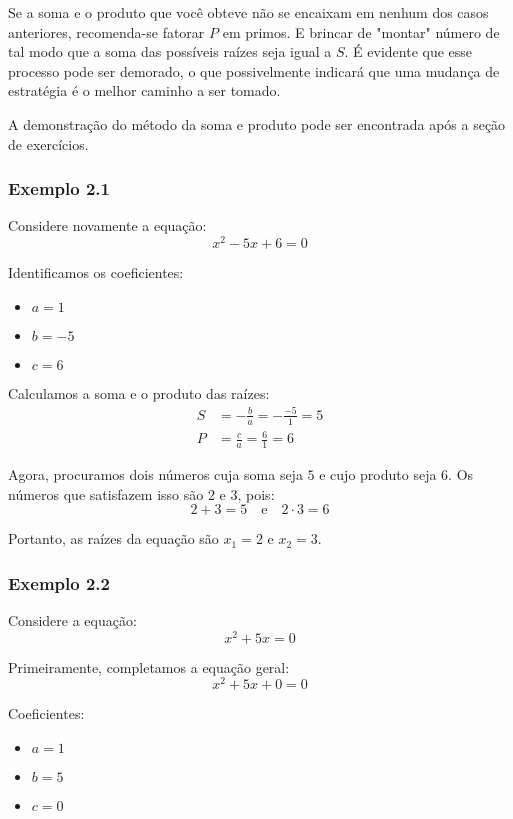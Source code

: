 \documentclass[12pt]{report}
\newcommand{\1}{\faThermometerEmpty}
\newcommand{\2}{\faThermometerQuarter}
\newcommand{\3}{\faThermometerHalf}
\newcommand{\4}{\faThermometerThreeQuarters}
\newcommand{\5}{\faThermometerFull}
\begin{document}
Se a soma e o produto que você obteve não se encaixam em nenhum dos casos anteriores, recomenda-se fatorar $P$ em primos. E brincar de "montar" número de tal modo que a soma das possíveis raízes seja igual a $S$. É evidente que esse processo pode ser demorado, o que possivelmente indicará que uma mudança de estratégia é o melhor caminho a ser tomado.

A demonstração do método da soma e produto pode ser encontrada após a seção de exercícios.



\subsubsection*{Exemplo 2.1}

Considere novamente a equação:
$$ x^2 - 5x + 6 = 0 $$

Identificamos os coeficientes:
\begin{itemize}
    \item $a = 1$
    \item $b = -5$
    \item $c = 6$
\end{itemize}

Calculamos a soma e o produto das raízes:
\[
\begin{aligned}
    S &= -\frac{b}{a} = -\frac{-5}{1} = 5 \\
    P &= \frac{c}{a} = \frac{6}{1} = 6
\end{aligned}
\]

Agora, procuramos dois números cuja soma seja $5$ e cujo produto seja $6$. Os números que satisfazem isso são $2$ e $3$, pois:
\[
2 + 3 = 5 \quad \text{e} \quad 2 \cdot 3 = 6
\]

Portanto, as raízes da equação são $x_1 = 2$ e $x_2 = 3$.



\subsubsection*{Exemplo 2.2}

Considere a equação:
$$ x^2 + 5x = 0 $$

Primeiramente, completamos a equação geral:
$$ x^2 + 5x + 0 = 0 $$

Coeficientes:
\begin{itemize}
    \item $a = 1$
    \item $b = 5$
    \item $c = 0$
\end{itemize}
\end{document}
